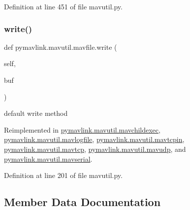 Definition at line 451 of file mavutil.\+py.

\mbox{\label{classpymavlink_1_1mavutil_1_1mavfile_a8f40348c156083384c07dfa73cf92a62}} 
\subsubsection{\texorpdfstring{write()}{write()}}
{\footnotesize\ttfamily def pymavlink.\+mavutil.\+mavfile.\+write (\begin{DoxyParamCaption}\item[{}]{self,  }\item[{}]{buf }\end{DoxyParamCaption})}

\begin{DoxyVerb}default write method\end{DoxyVerb}
 

Reimplemented in \mbox{\hyperlink{classpymavlink_1_1mavutil_1_1mavchildexec_af5ffc52892313980ff86884f05b3741a}{pymavlink.\+mavutil.\+mavchildexec}}, \mbox{\hyperlink{classpymavlink_1_1mavutil_1_1mavlogfile_a286beed914444073324880af5f611505}{pymavlink.\+mavutil.\+mavlogfile}}, \mbox{\hyperlink{classpymavlink_1_1mavutil_1_1mavtcpin_afa11c00945123d40e77e47015066670d}{pymavlink.\+mavutil.\+mavtcpin}}, \mbox{\hyperlink{classpymavlink_1_1mavutil_1_1mavtcp_abcc941efee4231016584e06c7cf07590}{pymavlink.\+mavutil.\+mavtcp}}, \mbox{\hyperlink{classpymavlink_1_1mavutil_1_1mavudp_a517fd3e5a3ad03f03ba505ff8b4d7572}{pymavlink.\+mavutil.\+mavudp}}, and \mbox{\hyperlink{classpymavlink_1_1mavutil_1_1mavserial_a6d0072efcfa0a49f95de45a8475b26e8}{pymavlink.\+mavutil.\+mavserial}}.



Definition at line 201 of file mavutil.\+py.



\subsection{Member Data Documentation}
\mbox{\label{classpymavlink_1_1mavutil_1_1mavfile_a3307e42a1f2ad53909dca6f9a232760c}} 
